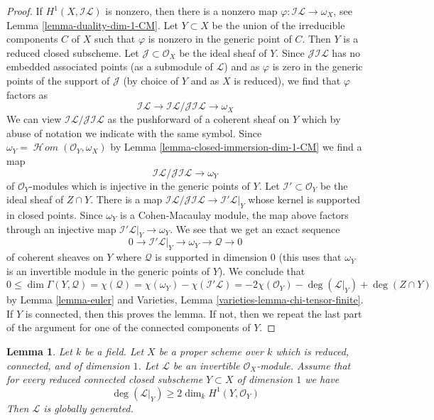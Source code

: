 \documentclass{stacks-project}
\theoremstyle{plain}
\newtheorem{lemma}[subsection]{Lemma}
\theoremstyle{definition}
\theoremstyle{remark}
\numberwithin{equation}{subsection}
\def\SheafHom{\mathop{\mathcal{H}\!\mathit{om}}\nolimits}
\begin{document}
\begin{proof}
If $H^1(X, \mathcal{I}\mathcal{L})$ is nonzero, then there is a nonzero map
$\varphi : \mathcal{I}\mathcal{L} \to \omega_X$, see
Lemma \ref{lemma-duality-dim-1-CM}. Let $Y \subset X$
be the union of the irreducible components $C$ of $X$ such that
$\varphi$ is nonzero in the generic point of $C$.
Then $Y$ is a reduced closed subscheme.
Let $\mathcal{J} \subset \mathcal{O}_X$ be the ideal sheaf of $Y$.
Since $\mathcal{J}\mathcal{I}\mathcal{L}$
has no embedded associated points
(as a submodule of $\mathcal{L}$) and as $\varphi$ is zero
in the generic points of the support of $\mathcal{J}$
(by choice of $Y$ and as $X$ is reduced), we find that
$\varphi$ factors as
$$
\mathcal{I}\mathcal{L} \to
\mathcal{I}\mathcal{L}/\mathcal{J}\mathcal{I}\mathcal{L} \to \omega_X
$$
We can view $\mathcal{I}\mathcal{L}/\mathcal{J}\mathcal{I}\mathcal{L}$
as the pushforward of a coherent sheaf on $Y$ which by abuse of
notation we indicate with the same symbol.
Since $\omega_Y = \SheafHom(\mathcal{O}_Y, \omega_X)$
by Lemma \ref{lemma-closed-immersion-dim-1-CM}
we find a map
$$
\mathcal{I}\mathcal{L}/
\mathcal{J}\mathcal{I}\mathcal{L} 
\to \omega_Y
$$
of $\mathcal{O}_Y$-modules which is injective in the generic points
of $Y$. Let $\mathcal{I}' \subset \mathcal{O}_Y$ be the ideal
sheaf of $Z \cap Y$. There is a map
$\mathcal{I}\mathcal{L}/\mathcal{J}\mathcal{I}\mathcal{L} \to
\mathcal{I}'\mathcal{L}|_Y$ whose kernel is supported in closed points.
Since $\omega_Y$ is a Cohen-Macaulay module, the map above
factors through an injective map $\mathcal{I}'\mathcal{L}|_Y \to
\omega_Y$. We see that we get
an exact sequence
$$
0 \to \mathcal{I}'\mathcal{L}|_Y \to \omega_Y \to \mathcal{Q} \to 0
$$
of coherent sheaves on $Y$ where $\mathcal{Q}$ is supported in dimension $0$
(this uses that $\omega_Y$ is an invertible module in the generic points
of $Y$). We conclude that
$$
0 \leq \dim \Gamma(Y, \mathcal{Q}) =
\chi(\mathcal{Q}) = \chi(\omega_Y) - \chi(\mathcal{I}'\mathcal{L}) =
-2\chi(\mathcal{O}_Y) - \deg(\mathcal{L}|_Y) + \deg(Z \cap Y)
$$
by Lemma \ref{lemma-euler} and
Varieties, Lemma \ref{varieties-lemma-chi-tensor-finite}.
If $Y$ is connected, then this proves the lemma.
If not, then we repeat the last part of the argument
for one of the connected components of $Y$.
\end{proof}

\begin{lemma}
\label{lemma-global-generation}
Let $k$ be a field. Let $X$ be a proper scheme over $k$
which is reduced, connected, and of dimension $1$.
Let $\mathcal{L}$ be an invertible $\mathcal{O}_X$-module.
Assume that for every reduced connected closed subscheme
$Y \subset X$ of dimension $1$ we have
$$
\deg(\mathcal{L}|_Y) \geq 2\dim_k H^1(Y, \mathcal{O}_Y)
$$
Then $\mathcal{L}$ is globally generated.
\end{lemma}
\end{document}
